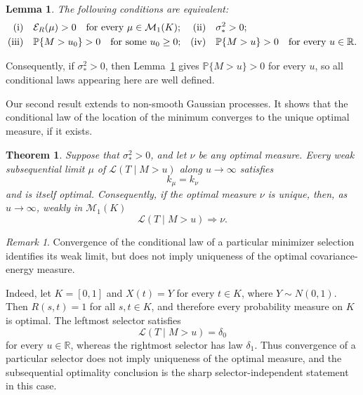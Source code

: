 \documentclass[11pt]{amsart}
\newtheorem{theorem}{Theorem}[section]
\newtheorem{lemma}[lemma]{Lemma}
\theoremstyle{definition}
\theoremstyle{remark}
\newtheorem{remark}[remark]{Remark}
\newcommand{\Pp}{\mathbb P}
\newcommand{\cM}{\mathcal M_1}
\begin{document}
\begin{lemma}
\label{lem:positivity}
The following conditions are equivalent:
\begin{align*}
 \textnormal{(i)}\quad &\mathcal E_R(\mu)>0\quad\text{for every }\mu\in\cM(K);
 &\textnormal{(ii)}\quad &\sigma_*^2>0;\\
 \textnormal{(iii)}\quad
 &\Pp\{M>u_0\}>0\quad\text{for some }u_0\geq0;
 &\textnormal{(iv)}\quad
 &\Pp\{M>u\}>0\quad\text{for every }u\in\mathbb R.
\end{align*}
\end{lemma}

Consequently, if $\sigma_*^2>0$, then Lemma~\ref{lem:positivity} gives
$\Pp\{M>u\}>0$ for every $u$, so all conditional laws appearing here  
are well defined.

Our second result extends \cite[Theorem 4.4]{chakrabarty2018asymptotic} to non-smooth Gaussian processes.  It shows that the conditional law of the location of the minimum converges to the unique optimal measure, if it exists.

\begin{theorem}
\label{thm:location}
Suppose that $\sigma_*^2>0$, and let $\nu$ be any optimal measure.
Every weak subsequential limit $\mu$ of $\mathcal L(T\mid M>u)$ along
$u\to\infty$ satisfies
\[
 k_\mu=k_\nu
\]
and is itself optimal.  Consequently, if the optimal measure $\nu$ is
unique, then, as $u\to\infty$, weakly in $\cM(K)$
\begin{equation}
 \mathcal L(T\mid M>u)\Longrightarrow\nu.
 \label{eq:location}
\end{equation}
\end{theorem}

\begin{remark}  Convergence of the conditional law
of a particular minimizer selection identifies its weak limit, but does
not imply uniqueness of the optimal covariance-energy measure.

Indeed, let $K=[0,1]$ and $X(t)=Y$ for every $t\in K$, where
$Y\sim N(0,1)$.  Then $R(s,t)=1$ for all $s,t\in K$, and therefore every
probability measure on $K$ is optimal.  The leftmost selector satisfies
\[
 \mathcal L(T\mid M>u)=\delta_0
\]
for every $u\in\mathbb R$, whereas the rightmost selector has law
$\delta_1$.  Thus convergence of a particular selector does not imply
uniqueness of the optimal measure, and the subsequential optimality
conclusion is the sharp selector-independent statement in this case.
\end{remark}
\end{document}

